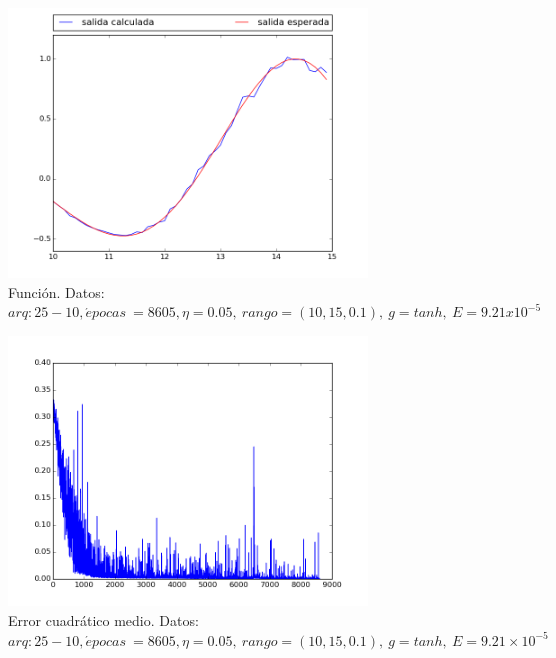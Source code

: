 \documentclass[12pt,a4paper]{article}
\begin{document}
\begin{figure}[H]
\centering
\includegraphics[width=0.85\textwidth]{img/_25__10_-eta_0_05-FUNCTION.png}
\caption{\label{fig:test10-15-tanh-fn-25} Función. Datos:  $arq: 25-10, \acute{e} pocas \ = 8605, \eta = 0.05,\ rango=(10, 15, 0.1),\ g=tanh, \ E = 9.21 x 10^{-5}$}
\end{figure}

\begin{figure}[H]
\centering
\includegraphics[width=0.85\textwidth]{img/_25__10_-eta_0_05-ERROR.png}
\caption{\label{fig:test10-15-tanh-error-25} Error cuadrático medio. Datos:  $arq: 25-10, \acute{e} pocas \ = 8605, \eta = 0.05,\ rango=(10, 15, 0.1),\ g=tanh, \ E = 9.21 \times 10^{-5}$}
\end{figure}
\end{document}
